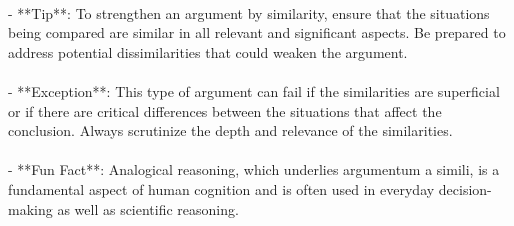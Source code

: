 \documentclass[a4paper,12pt,single,pdftex]{scrartcl}
\begin{document}
    
      
    \\

    
      - **Tip**: To strengthen an argument by similarity, ensure that the situations being compared are similar in all relevant and significant aspects. Be prepared to address potential dissimilarities that could weaken the argument.
    \\

    
      
    \\

    
      - **Exception**: This type of argument can fail if the similarities are superficial or if there are critical differences between the situations that affect the conclusion. Always scrutinize the depth and relevance of the similarities.
    \\

    
      
    \\

    
      - **Fun Fact**: Analogical reasoning, which underlies argumentum a simili, is a fundamental aspect of human cognition and is often used in everyday decision-making as well as scientific reasoning.
    \\
\end{document}

